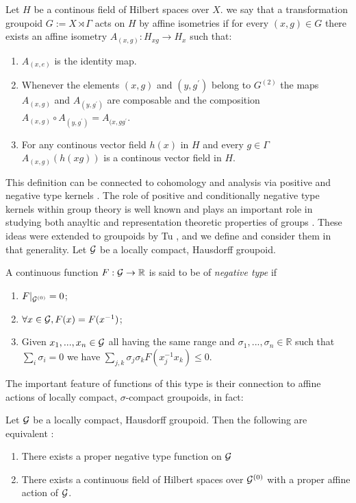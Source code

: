 \begin{definition}
Let $H$ be a continous field of Hilbert spaces over $X$. we say that a transformation groupoid $G:=X\rtimes \Gamma$ acts on $H$ by affine isometries if for every $(x,g) \in G$ there exists an affine isometry $A_{(x,g)}:H_{xg}\rightarrow H_{x}$ such that:
\begin{enumerate}
\item $A_{(x,e)}$ is the identity map.
\item Whenever the elements $(x,g)$ and $(y,g^{'})$ belong to $G^{(2)}$ the maps $A_{(x,g)}$ and $A_{(y,g^{'})}$ are composable and the composition $A_{(x,g)}\circ A_{(y,g^{'})}=A_{(x,gg^{'}}$.
\item For any continous vector field $h(x)$ in $H$ and every $g \in \Gamma$ $A_{(x,g)}(h(xg))$ is a continous vector field in $H$.
\end{enumerate}
\end{definition}

This definition can be connected to cohomology and analysis via positive and negative type kernels \cite{MR2415834,MR2158394}. The role of positive and conditionally negative type kernels within group theory is well known and plays an important role in studying both anayltic and representation theoretic properties of groups \cite{MR2415834,MR1487204}. These ideas were extended to groupoids by Tu \cite{MR1703305}, and we define and consider them in that generality. Let $\mathcal{G}$ be a locally compact, Hausdorff groupoid.

\begin{definition}
A continuous function $F: \mathcal{G} \rightarrow \mathbb{R}$ is said to be of \textit{negative type} if 
\begin{enumerate}
\item $F|_{\mathcal{G}^{(0)}}=0$;
\item $\forall x \in \mathcal{G}, F(x)=F(x^{-1})$;
\item Given $x_{1},...,x_{n} \in \mathcal{G}$ all having the same range and $\sigma_{1},...,\sigma_{n} \in \mathbb{R}$ such that $\sum_{i}\sigma_{i}=0$ we have $\sum_{j,k}\sigma_{j}\sigma_{k}F(x_{j}^{-1}x_{k})\leq 0$.
\end{enumerate}
\end{definition}

The important feature of functions of this type is their connection to affine actions of locally compact, $\sigma$-compact groupoids, in fact:
\begin{theorem}Let $\mathcal{G}$ be a locally compact, Hausdorff groupoid. Then the following are equivalent \cite{MR1703305}:
\begin{enumerate}
\item There exists a proper negative type function on $\mathcal{G}$
\item There exists a continuous field of Hilbert spaces over $\mathcal{G}^{(0)}$ with a proper affine action of $\mathcal{G}$.
\end{enumerate}
\end{theorem}

